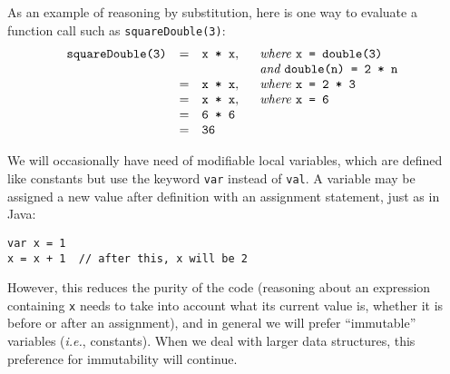 As an example of reasoning by substitution, here is one way to evaluate a function call such as \verb|squareDouble(3)|:
\[ \begin{array}{rcl}
\verb|squareDouble(3)| & = & \verb|x * x|,\quad
\begin{array}[t]{l}
\textit{where }\verb|x = double(3)|\\
\textit{and }\verb|double(n) = 2 * n|
\end{array}\\
& = & \verb|x * x|,\quad
\begin{array}[t]{l}
\textit{where }\verb|x = 2 * 3|
\end{array}\\
& = & \verb|x * x|,\quad
\begin{array}[t]{l}
\textit{where }\verb|x = 6|
\end{array}\\
& = & \verb|6 * 6|\\
& = & \verb|36|
\end{array} \]

We will occasionally have need of modifiable local variables, which are defined like constants but use the keyword \verb|var| instead of \verb|val|. A variable may be assigned a new value after definition with an assignment statement, just as in Java:
\begin{verbatim}
var x = 1
x = x + 1  // after this, x will be 2
\end{verbatim}
However, this reduces the purity of the code (reasoning about an expression containing \verb|x| needs to take into account what its current value is, whether it is before or after an assignment), and in general we will prefer ``immutable'' variables (\textit{i.e.}, constants). When we deal with larger data structures, this preference for immutability will continue.

